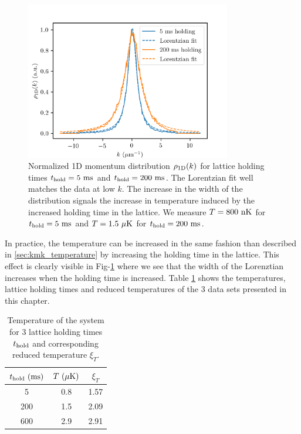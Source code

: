 \begin{figure}
    \centering
    \includegraphics[width=0.8\textwidth]{Fig/Chapter5/1D_temperature_lorentz.png}
    \caption[Normalized 1D momentum distribution $\rho_{\rm{1D}} (k)$ for lattice holding times $t_{\rm{hold}}=5 \ \rm{ms}$ and $t_{\rm{hold}}=200 \ \rm{ms}$]{Normalized 1D momentum distribution $\rho_{\rm{1D}} (k)$ for lattice holding times $t_{\rm{hold}}=5 \ \rm{ms}$ and $t_{\rm{hold}}=200 \ \rm{ms}$. The Lorentzian fit well matches the data at low $k$. The increase in the width of the distribution signals the increase in temperature induced by the increased holding time in the lattice. We measure $T=800 \ \rm{nK}$ for $t_{\rm{hold}}=5 \ \rm{ms}$ and $T=1.5 \ \mu \rm{K}$ for $t_{\rm{hold}}=200 \ \rm{ms}$.}
    \label{fig:1D_temperature}
\end{figure}

In practice, the temperature can be increased in the same fashion than described in \ref{sec:kmk_temperature} by increasing the holding time in the lattice. This effect is clearly visible in Fig-\ref{fig:1D_temperature} where we see that the width of the Lorenztian increases when the holding time is increased. Table \ref{tab:T_vs_t_hold} shows the temperatures, lattice holding times and reduced temperatures of the 3 data sets presented in this chapter. 

\begin{table}[h!]
\centering
{
    \begin{tabular}{c|c|c}
        {\color{MainColor} $t_{\rm{hold}} \ (\rm{ms})$} &  {\color{MainColor}$T \ (\mu \rm{K})$} & {\color{MainColor}$\xi_T$} \\
        \hline
        5 & 0.8 & 1.57 \\
        200 & 1.5 & 2.09 \\
        600 & 2.9 & 2.91 \\
    \end{tabular}}
\caption{Temperature of the system for 3 lattice holding times $t_{\rm{hold}}$ and corresponding reduced temperature $\xi_T$.}
\label{tab:T_vs_t_hold}
\end{table}


